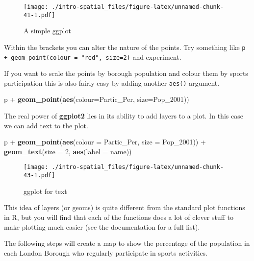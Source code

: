 \documentclass[]{article}
\newenvironment{Shaded}{}{}
\newcommand{\KeywordTok}[1]{\textcolor[rgb]{0.00,0.44,0.13}{\textbf{{#1}}}}
\newcommand{\DataTypeTok}[1]{\textcolor[rgb]{0.56,0.13,0.00}{{#1}}}
\newcommand{\DecValTok}[1]{\textcolor[rgb]{0.25,0.63,0.44}{{#1}}}
\newcommand{\StringTok}[1]{\textcolor[rgb]{0.25,0.44,0.63}{{#1}}}
\newcommand{\NormalTok}[1]{{#1}}
\begin{document}
\begin{figure}[htbp]
\centering
\texttt{[image: ./intro-spatial\_files/figure-latex/unnamed-chunk-41-1.pdf]}
\caption{A simple ggplot}
\end{figure}

Within the brackets you can alter the nature of the points. Try
something like \texttt{p + geom\_point(colour = "red", size=2)} and
experiment.

If you want to scale the points by borough population and colour them by
sports participation this is also fairly easy by adding another
\texttt{aes()} argument.

\begin{Shaded}
\begin{Highlighting}[]
\NormalTok{p +}\StringTok{ }\KeywordTok{geom_point}\NormalTok{(}\KeywordTok{aes}\NormalTok{(}\DataTypeTok{colour=}\NormalTok{Partic_Per, }\DataTypeTok{size=}\NormalTok{Pop_2001))}
\end{Highlighting}
\end{Shaded}

The real power of \textbf{ggplot2} lies in its ability to add layers to
a plot. In this case we can add text to the plot.

\begin{Shaded}
\begin{Highlighting}[]
\NormalTok{p +}\StringTok{ }\KeywordTok{geom_point}\NormalTok{(}\KeywordTok{aes}\NormalTok{(}\DataTypeTok{colour =} \NormalTok{Partic_Per, }\DataTypeTok{size =} \NormalTok{Pop_2001)) +}\StringTok{ }\KeywordTok{geom_text}\NormalTok{(}\DataTypeTok{size =} \DecValTok{2}\NormalTok{, }\KeywordTok{aes}\NormalTok{(}\DataTypeTok{label =} \NormalTok{name))}
\end{Highlighting}
\end{Shaded}

\begin{figure}[htbp]
\centering
\texttt{[image: ./intro-spatial\_files/figure-latex/unnamed-chunk-43-1.pdf]}
\caption{ggplot for text}
\end{figure}

This idea of layers (or geoms) is quite different from the standard plot
functions in R, but you will find that each of the functions does a lot
of clever stuff to make plotting much easier (see the documentation for
a full list).

The following steps will create a map to show the percentage of the
population in each London Borough who regularly participate in sports
activities.
\end{document}

